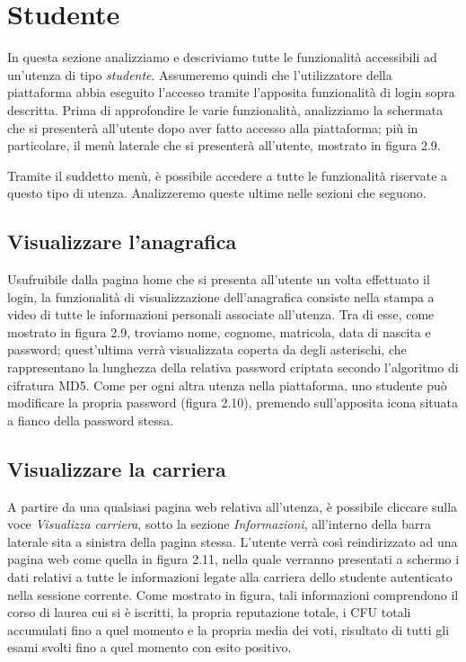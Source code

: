 \documentclass [a4paper,11pt]{book}
\begin{document}

\medskip
\medskip

\section{Studente}

In questa sezione analizziamo e descriviamo tutte le funzionalità accessibili ad un'utenza di tipo \emph{studente}. Assumeremo quindi che l'utilizzatore della piattaforma abbia eseguito l'accesso tramite l'apposita funzionalità di login sopra descritta. Prima di approfondire le varie funzionalità, analizziamo la schermata che si presenterà all'utente dopo aver fatto accesso alla piattaforma; più in particolare, il menù laterale che si presenterà all'utente, mostrato in figura 2.9.


Tramite il suddetto menù, è possibile accedere a tutte le funzionalità riservate a questo tipo di utenza. Analizzeremo queste ultime nelle sezioni che seguono.

\medskip

\subsection{Visualizzare l'anagrafica}

Usufruibile dalla pagina home che si presenta all'utente un volta effettuato il login, la funzionalità di visualizzazione dell'anagrafica consiste nella stampa a video di tutte le informazioni personali associate all'utenza. Tra di esse, come mostrato in figura 2.9, troviamo nome, cognome, matricola, data di nascita e password; quest'ultima verrà visualizzata coperta da degli asterischi, che rappresentano la lunghezza della relativa password criptata secondo l'algoritmo di cifratura MD5. Come per ogni altra utenza nella piattaforma, uno studente può modificare la propria password (figura 2.10), premendo sull'apposita icona situata a fianco della password stessa.


\medskip

\subsection{Visualizzare la carriera}

A partire da una qualsiasi pagina web relativa all'utenza, è possibile cliccare sulla voce \emph{Visualizza carriera}, sotto la sezione \emph{Informazioni}, all'interno della barra laterale sita a sinistra della pagina stessa. L'utente verrà così reindirizzato ad una pagina web come quella in figura 2.11, nella quale verranno presentati a schermo i dati relativi a tutte le informazioni legate alla carriera dello studente autenticato nella sessione corrente. Come mostrato in figura, tali informazioni comprendono il corso di laurea cui si è iscritti, la propria reputazione totale, i CFU totali accumulati fino a quel momento e la propria media dei voti, risultato di tutti gli esami svolti fino a quel momento con esito positivo.
\end{document}

